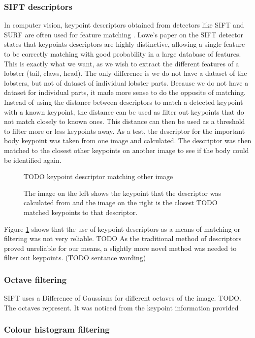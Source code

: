 \subsubsection{SIFT descriptors}
In computer vision, keypoint descriptors obtained from detectors like SIFT and SURF are often used for feature matching \cite{cv-matching}. Lowe's paper \cite{sift} on the SIFT detector states that keypoints descriptors are highly distinctive, allowing a single feature to be correctly matching with good probability in a large database of features. This is exactly what we want, as we wish to extract the different features of a lobster (tail, claws, head). The only difference is we do not have a dataset of the lobsters, but not of dataset of individual lobster parts. 
\n
Because we do not have a dataset for individual parts, it made more sense to do the opposite of matching. Instead of using the distance between descriptors to match a detected keypoint with a known keypoint, the distance can be used as filter out keypoints that do not match closely to known ones. This distance can then be used as a threshold to filter more or less keypoints away. 
\n
As a test, the descriptor for the important body keypoint was taken from one image and calculated. The descriptor was then matched to the closest other keypoints on another image to see if the body could be identified again. 

\begin{figure}[H]
\centering
TODO keypoint descriptor matching other image
\caption{The image on the left shows the keypoint that the descriptor was calculated from and the image on the right is the closest TODO matched keypoints to that descriptor.}
\label{fig:kp-descriptor}
\end{figure}
\noindent
Figure \ref{fig:kp-descriptor} shows that the use of keypoint descriptors as a means of matching or filtering was not very reliable. TODO
\n
As the traditional method of descriptors proved unreliable for our means, a slightly more novel method was needed to filter out keypoints. (TODO sentance wording)

\subsubsection{Octave filtering}
SIFT uses a Difference of Gaussians for different octaves of the image.  TODO. The octaves represent. It was noticed from the keypoint information provided 


\subsubsection{Colour histogram filtering}


